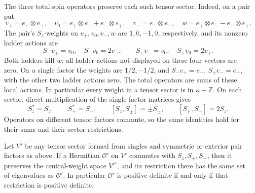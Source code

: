 The three total spin operators preserve each such tensor
sector.  Indeed, on a pair put
\[
 v_+=e_+\otimes e_+,\quad
 v_0=e_+\otimes e_-+e_-\otimes e_+,\quad
 v_-=e_-\otimes e_-,\quad
 w=e_+\otimes e_--e_-\otimes e_+.
\]
The pair's \(S_z\)-weights on \(v_+,v_0,v_-,w\) are
\(1,0,-1,0\), respectively, and its nonzero ladder actions are
\[
 S_-v_+=v_0,\quad S_-v_0=2v_-,\qquad
 S_+v_-=v_0,\quad S_+v_0=2v_+.
\]
Both ladders kill \(w\); all ladder actions not displayed on
these four vectors are zero.  On a single factor the weights
are \(1/2,-1/2\), and \(S_-e_+=e_-\), \(S_+e_-=e_+\),
with the other two ladder actions zero.  The total operators
are sums of these local actions.  In particular every weight
in a tensor sector is in \(\kappa+\mathbb Z\).  On each sector,
direct multiplication of the single-factor matrices gives
\[
 S_z^*=S_z,\qquad S_+^*=S_-,\qquad
 [S_z,S_\pm]=\pm S_\pm,\qquad [S_+,S_-]=2S_z.
\]
Operators on different tensor factors commute, so the same
identities hold for their sums and their sector restrictions.

\begin{lemma}\label{l:sector}
Let \(V'\) be any tensor sector formed from singles and
symmetric or exterior pair factors as above.
If a Hermitian \(\mathcal O'\) on \(V'\) commutes with
\(S_z,S_+,S_-\), then it preserves the central-weight space
\(V'^\circ\), and its restriction there has the same set of
eigenvalues as \(\mathcal O'\).
In particular \(\mathcal O'\) is positive definite if and only if
that restriction is positive definite.
\end{lemma}

